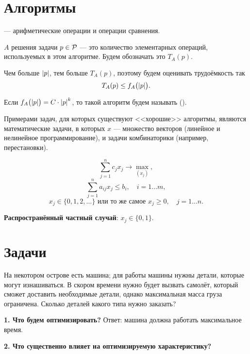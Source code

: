 \section{Алгоритмы}


 --- арифметические операции и операции сравнения.


 $A$ решения задачи $p \in \P$ --- это количество элементарных операций, используемых в этом алгоритме. Будем обозначать это $T_A(p)$.

\remark

Чем больше $\abs{p}$, тем больше $T_A(p)$, поэтому будем оценивать трудоёмкость так
\[
	T_A(p) \le f_A\big(\abs{p}\big).
\]


Если $f_A\big(\abs{p}\big) = C \cdot \abs{p}^k$, то такой алгоритм будем называть  ().

Примерами задач, для которых существуют <<хорошие>> алгоритмы, являются математические задачи, в которых $x$ --- множество векторов (линейное и нелинейное программирование), и задачи комбинаторики (например, перестановки).


\[\sum_{j=1}^{n} c_j x_j \to \max_{(x_j)},\]
\[\sum_{j=1}^{n}a_{ij} x_j \le b_i, \quad i = 1\dots m,\]
\[x_j \in \{0, 1, 2, \dots\} \text{ или то же самое } x_j \ge 0, \quad j = 1\dots n.\]

\textbf{Распространённый частный случай}: $x_j \in \{0, 1\}$.

\section{Задачи}


На некотором острове есть машина; для работы машины нужны детали, которые могут изнашиваться. В скором времени нужно будет вызвать самолёт, который сможет доставить необходимые детали, однако максимальная масса груза ограничена. Сколько деталей какого типа нужно заказать?

\textbf{1. Что будем оптимизировать?} Ответ: машина должна работать максимальное время.

\textbf{2. Что существенно влияет на оптимизируемую характеристику?}


